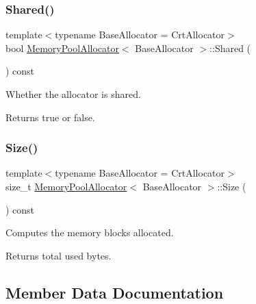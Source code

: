 \subsubsection{\texorpdfstring{Shared()}{Shared()}}
{\footnotesize\ttfamily template$<$typename Base\+Allocator = Crt\+Allocator$>$ \\
bool \hyperlink{classMemoryPoolAllocator}{Memory\+Pool\+Allocator}$<$ Base\+Allocator $>$\+::Shared (\begin{DoxyParamCaption}{ }\end{DoxyParamCaption}) const\hspace{0.3cm}{\ttfamily [inline]}}



Whether the allocator is shared. 

\begin{DoxyReturn}{Returns}
true or false. 
\end{DoxyReturn}
\mbox{\label{classMemoryPoolAllocator_a53abb6188aea4a687ca9f6d778fd1d2d}} 
\subsubsection{\texorpdfstring{Size()}{Size()}}
{\footnotesize\ttfamily template$<$typename Base\+Allocator = Crt\+Allocator$>$ \\
size\+\_\+t \hyperlink{classMemoryPoolAllocator}{Memory\+Pool\+Allocator}$<$ Base\+Allocator $>$\+::Size (\begin{DoxyParamCaption}{ }\end{DoxyParamCaption}) const\hspace{0.3cm}{\ttfamily [inline]}}



Computes the memory blocks allocated. 

\begin{DoxyReturn}{Returns}
total used bytes. 
\end{DoxyReturn}


\subsection{Member Data Documentation}
\mbox{\label{classMemoryPoolAllocator_a628cd7f46e838fb37ceccf65dd17bce6}} 
